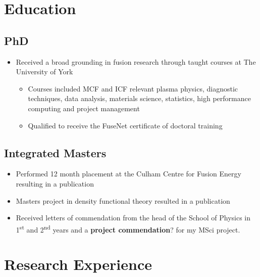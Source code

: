 \documentclass[11pt,a4paper,sans]{moderncv}        %
\begin{document}
\makecvtitle

\section{Education}
\subsection{PhD}
{\begin{itemize}%
\item Received a broad grounding in fusion research through taught courses at The University of York%
\begin{itemize}
\item Courses included MCF and ICF relevant plasma physics, diagnostic techniques, data analysis, materials science, statistics, high performance computing and project management
\item Qualified to receive the FuseNet certificate of doctoral training
\end{itemize}
\end{itemize}}
\subsection{Integrated Masters}
{\begin{itemize}%
\item Performed 12 month placement at the Culham Centre for Fusion Energy resulting in a publication
\item Masters project in density functional theory resulted in a publication
\item Received letters of commendation from the head of the School of Physics in 1\textsuperscript{st} and 2\textsuperscript{nd} years and a \textbf{project commendation}? for my MSci project.
\end{itemize}}

\section{Research Experience}
\end{document}
